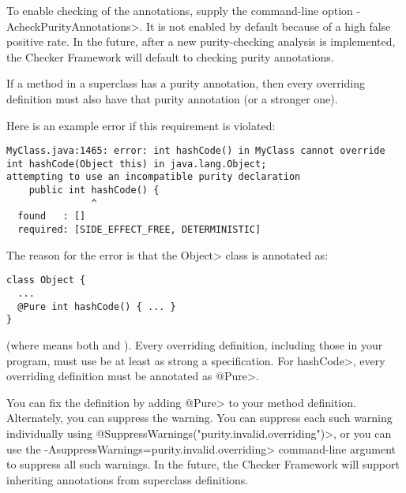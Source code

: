 To enable
checking of the annotations, supply the command-line option
\<-AcheckPurityAnnotations>.  It is not enabled by default because of a high false
positive rate.  In the future, after a new purity-checking analysis is
implemented, the Checker Framework will default to checking purity
annotations.



If a method in a superclass has a purity annotation, then every overriding
definition must also have that purity annotation (or a stronger one).

Here is an example error if this requirement is violated:

\begin{mysmall}
\begin{Verbatim}
MyClass.java:1465: error: int hashCode() in MyClass cannot override int hashCode(Object this) in java.lang.Object;
attempting to use an incompatible purity declaration
    public int hashCode() {
               ^
  found   : []
  required: [SIDE_EFFECT_FREE, DETERMINISTIC]
\end{Verbatim}
\end{mysmall}

\noindent
The reason for the error is that the \<Object> class is annotated as:

\begin{Verbatim}
class Object {
  ...
  @Pure int hashCode() { ... }
}
\end{Verbatim}

\noindent
(where  means both
 and
).  Every overriding
definition, including those in your program, must use be at least as strong
a specification.  For \<hashCode>, every overriding definition must be
annotated as \<@Pure>.

You can fix the definition by adding \<@Pure> to your method definition.
Alternately, you can suppress the warning.
You can suppress each such warning individually using
\<@SuppressWarnings("purity.invalid.overriding")>,
or you can use the \<-AsuppressWarnings=purity.invalid.overriding>
command-line argument to suppress all such warnings.
In the future, the Checker Framework will support inheriting annotations
from superclass definitions.


